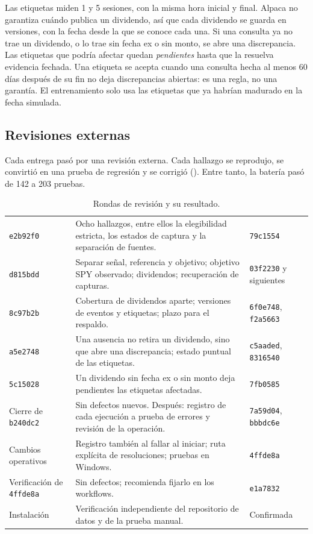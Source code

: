Las etiquetas miden 1 y 5 sesiones, con la misma hora inicial y final. Alpaca no garantiza cuándo publica un
dividendo, así que cada dividendo se guarda en versiones, con la fecha desde la que se conoce cada una. Si
una consulta ya no trae un dividendo, o lo trae sin fecha ex o sin monto, se abre una discrepancia. Las
etiquetas que podría afectar quedan \emph{pendientes} hasta que la resuelva evidencia fechada. Una etiqueta
se acepta cuando una consulta hecha al menos 60 días después de su fin no deja discrepancias abiertas: es
una regla, no una garantía. El entrenamiento solo usa las etiquetas que ya habrían madurado en la fecha
simulada.

\subsection{Revisiones externas}\label{sec:estado_revisiones}

Cada entrega pasó por una revisión externa. Cada hallazgo se reprodujo, se convirtió en una prueba de
regresión y se corrigió (). Entre tanto, la batería pasó de 142 a 203 pruebas.

\begin{table}[H]
\centering\small
\caption{Rondas de revisión y su resultado.}
\label{tab:revisiones}
\begin{tabularx}{\linewidth}{@{}>{\RaggedRight}p{3.1cm} Y >{\RaggedRight\arraybackslash}p{2.5cm}@{}}
\toprule
{} &  & \\
\midrule
\texttt{e2b92f0} & Ocho hallazgos, entre ellos la elegibilidad estricta, los estados de captura y la
separación de fuentes. & \texttt{79c1554}\\
\texttt{d815bdd} & Separar señal, referencia y objetivo; objetivo SPY observado; dividendos; recuperación de
capturas. & \texttt{03f2230} y siguientes\\
\texttt{8c97b2b} & Cobertura de dividendos aparte; versiones de eventos y etiquetas; plazo para el respaldo. &
\texttt{6f0e748}, \texttt{f2a5663}\\
\texttt{a5e2748} & Una ausencia no retira un dividendo, sino que abre una discrepancia; estado puntual de las
etiquetas. & \texttt{c5aaded}, \texttt{8316540}\\
\texttt{5c15028} & Un dividendo sin fecha ex o sin monto deja pendientes las etiquetas afectadas. &
\texttt{7fb0585}\\
Cierre de \texttt{b240dc2} & Sin defectos nuevos. Después: registro de cada ejecución a prueba de errores y
revisión de la operación. & \texttt{7a59d04}, \texttt{bbbdc6e}\\
Cambios operativos & Registro también al fallar al iniciar; ruta explícita de resoluciones; pruebas en
Windows. & \texttt{4ffde8a}\\
Verificación de \texttt{4ffde8a} & Sin defectos; recomienda fijarlo en los workflows. & \texttt{e1a7832}\\
Instalación & Verificación independiente del repositorio de datos y de la prueba manual. & Confirmada\\
\bottomrule
\end{tabularx}
\end{table}

